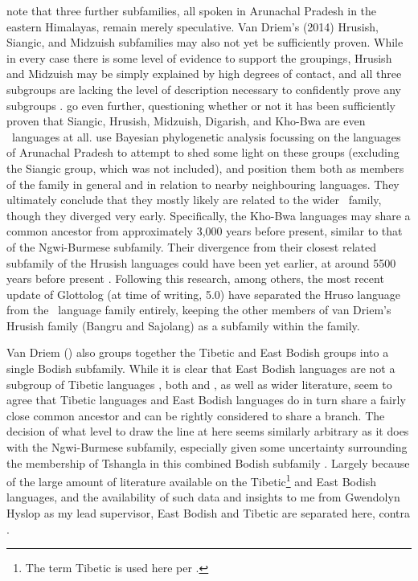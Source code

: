  note that three further subfamilies, all spoken in Arunachal Pradesh in the eastern Himalayas, remain merely speculative. Van Driem's (2014) Hrusish, Siangic, and Midzuish subfamilies may also not yet be sufficiently proven. While in every case there is some level of evidence to support the groupings, Hrusish and Midzuish may be simply explained by high degrees of contact, and all three subgroups are lacking the level of description necessary to confidently prove any subgroups \cite{Post2017}.  go even further, questioning whether or not it has been sufficiently proven that Siangic, Hrusish, Midzuish, Digarish, and Kho-Bwa are even \lfam\ languages at all.  use Bayesian phylogenetic analysis focussing on the languages of Arunachal Pradesh to attempt to shed some light on these groups (excluding the Siangic group, which was not included), and position them both as members of the family in general and in relation to nearby neighbouring languages. They ultimately conclude that they mostly likely are related to the wider \lfam\ family, though they diverged very early. Specifically, the Kho-Bwa languages may share a common ancestor from approximately 3,000 years before present, similar to that of the Ngwi-Burmese subfamily. Their divergence from their closest related subfamily of the Hrusish languages could have been yet earlier, at around 5500 years before present \cite{Wu2022}. Following this research, among others, the most recent update of Glottolog (at time of writing, 5.0)  have separated the Hruso language from the \lfam\ language family entirely, keeping the other members of van Driem's Hrusish family (Bangru and Sajolang) as a subfamily within the family.

Van Driem (\citeyear{VanDriem2014}) also groups together the Tibetic and East Bodish groups into a single Bodish subfamily. While it is clear that East Bodish languages are not a subgroup of Tibetic languages \cite{Hyslop2017}, both  and , as well as wider literature, seem to agree that Tibetic languages and East Bodish languages do in turn share a fairly close common ancestor and can be rightly considered to share a branch. The decision of what level to draw the line at here seems similarly arbitrary as it does with the Ngwi-Burmese subfamily, especially given some uncertainty surrounding the membership of Tshangla in this combined Bodish subfamily \cite{Thurgood2017STIntro}. Largely because of the large amount of literature available on the Tibetic\footnote{The term Tibetic is used here per .} and East Bodish languages, and the availability of such data and insights to me from Gwendolyn Hyslop as my lead supervisor, East Bodish and Tibetic are separated here, contra . 

